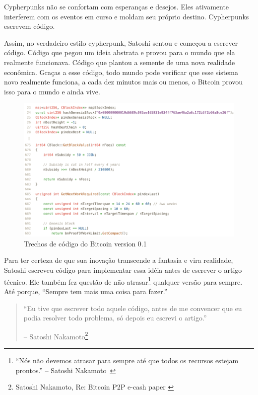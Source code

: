 Cypherpunks não se confortam com esperanças e desejos. 
Eles ativamente interferem com os eventos em curso e moldam seu próprio destino. 
Cypherpunks escrevem código.

Assim, no verdadeiro estilo cypherpunk, Satoshi sentou e começou a escrever código. 
Código que pegou um ideia abstrata e provou para o mundo que ela realmente funcionava. 
Código que plantou a semente de uma nova realidade econômica.
Graças a esse código, todo mundo pode verificar que esse sistema novo realmente funciona, 
a cada dez minutos mais ou menos, o Bitcoin provou isso para o mundo e ainda vive.

\begin{figure}
  \includegraphics{assets/images/bitcoin-code-white.png}
  \caption{Trechos de código do Bitcoin version 0.1}
  \label{fig:bitcoin-code-white}
\end{figure}

Para ter certeza de que sua inovação transcende a fantasia e vira realidade, Satoshi 
escreveu código para implementar essa idéia antes de escrever o artigo técnico. 
Ele também fez questão de não atrasar\footnote{\enquote{Nós não devemos atrasar 
		para sempre até que todos os recursos estejam prontos.} 
	-- Satoshi Nakamoto~\cite{satoshi-delay}} qualquer versão para sempre.
	Até porque, \enquote{Sempre tem mais uma coisa para fazer.}

\begin{quotation}\begin{samepage}
\enquote{Eu tive que escrever todo aquele código, antes de me convencer que eu podia resolver todo problema, só depois eu escrevi o artigo.}
\begin{flushright} -- Satoshi Nakamoto\footnote{Satoshi Nakamoto, Re: Bitcoin P2P e-cash paper \cite{satoshi-mail-code-first}}
\end{flushright}\end{samepage}\end{quotation}

